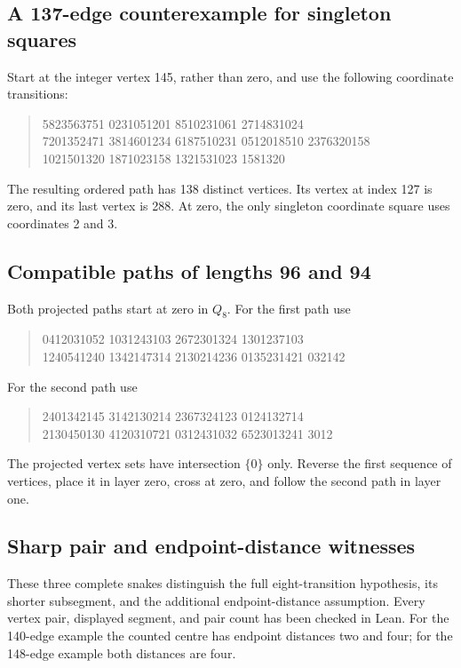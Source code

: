 \documentclass[11pt,a4paper]{article}
\theoremstyle{definition}
\theoremstyle{remark}
\newcommand{\Q}{Q}
\begin{document}
\subsection{A 137-edge counterexample for singleton squares}\label{app:square-counterexample}
Start at the integer vertex 145, rather than zero, and use the following coordinate transitions:
\begin{quote}\small{} 5823563751 0231051201 8510231061 2714831024\\
7201352471 3814601234 6187510231 0512018510 2376320158\\
1021501320 1871023158 1321531023 1581320
\end{quote}
The resulting ordered path has 138 distinct vertices. Its vertex at index 127 is zero, and its last vertex is 288. At zero, the only singleton coordinate square uses coordinates 2 and 3.

\subsection{Compatible paths of lengths 96 and 94}\label{app:joint-seed}
Both projected paths start at zero in $\Q_8$. For the first path use
\begin{quote}\small{} 0412031052 1031243103 2672301324 1301237103\\
1240541240 1342147314 2130214236 0135231421 032142
\end{quote}
For the second path use
\begin{quote}\small{} 2401342145 3142130214 2367324123 0124132714\\
2130450130 4120310721 0312431032 6523013241 3012
\end{quote}
The projected vertex sets have intersection $\{0\}$ only. Reverse the first sequence of vertices, place it in layer zero, cross at zero, and follow the second path in layer one.


\subsection{Sharp pair and endpoint-distance witnesses}\label{app:endpoint-witnesses}
These three complete snakes distinguish the full eight-transition hypothesis, its shorter subsegment, and the additional endpoint-distance assumption. Every vertex pair, displayed segment, and pair count has been checked in Lean. For the 140-edge example the counted centre has endpoint distances two and four; for the 148-edge example both distances are four.
\end{document}
